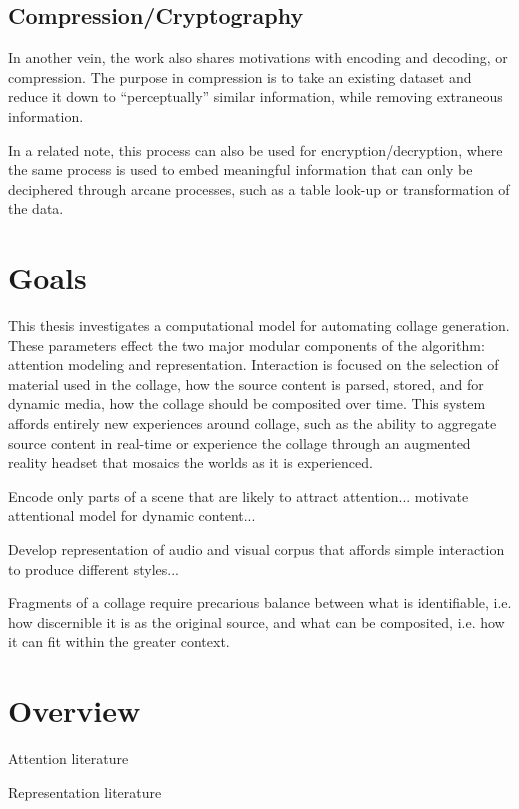 \subsection{Compression/Cryptography}
In another vein, the work also shares motivations with encoding and decoding, or compression.  The purpose in compression is to take an existing dataset and reduce it down to ``perceptually'' similar information, while removing extraneous information.  

In a related note, this process can also be used for encryption/decryption, where the same process is used to embed meaningful information that can only be deciphered through arcane processes, such as a table look-up or transformation of the data.  

\section{Goals}

This thesis investigates a computational model for automating collage generation.  These parameters effect the two major modular components of the algorithm: attention modeling and representation.   Interaction is focused on the selection of material used in the collage, how the source content is parsed, stored, and for dynamic media, how the collage should be composited over time.  This system affords entirely new experiences around collage, such as the ability to aggregate source content in real-time or experience the collage through an augmented reality headset that mosaics the worlds as it is experienced.  

Encode only parts of a scene that are likely to attract attention... motivate attentional model for dynamic content... 

Develop representation of audio and visual corpus that affords simple interaction to produce different styles...

Fragments of a collage require precarious balance between what is identifiable, i.e. how discernible it is as the original source, and what can be composited, i.e. how it can fit within the greater context. 

\section{Overview}
Attention literature

Representation literature
